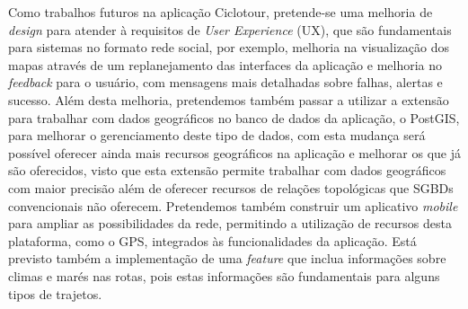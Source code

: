 Como trabalhos futuros na aplicação Ciclotour, pretende-se uma melhoria de \textit{design} para atender à requisitos de \textit{User Experience} (UX), 
que são fundamentais para sistemas no formato rede social, por exemplo, melhoria na visualização dos mapas através de um replanejamento das 
interfaces da aplicação e melhoria no \textit{feedback} para o usuário, com mensagens mais detalhadas sobre falhas, alertas e sucesso. Além desta 
melhoria, pretendemos também passar a utilizar a extensão para trabalhar com dados geográficos no banco de dados da aplicação, o PostGIS, para 
melhorar o gerenciamento deste tipo de dados, com esta mudança será possível oferecer ainda mais recursos geográficos na aplicação e melhorar os 
que já são oferecidos, visto que esta extensão permite trabalhar com dados geográficos com maior precisão além de oferecer recursos de relações 
topológicas que SGBDs convencionais não oferecem. Pretendemos também construir um aplicativo \textit{mobile} para ampliar as possibilidades da rede, 
permitindo a utilização de recursos desta plataforma, como o GPS, integrados às funcionalidades da aplicação. Está previsto também a implementação de 
uma \textit{feature} que inclua informações sobre climas e marés nas rotas, pois estas informações são fundamentais para alguns tipos de trajetos.



